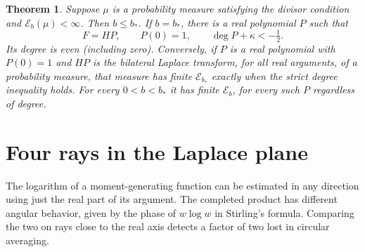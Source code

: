 \documentclass[11pt]{article}
\newtheorem{theorem}{Theorem}
\newcommand{\E}{\mathcal E}\newcommand{\F}{\mathcal F}
\begin{document}
\begin{theorem}\label{main}
Suppose $\mu$ is a probability measure satisfying the divisor condition and $\E_b(\mu)<\infty$. Then $b\le b_*$. If $b=b_*$, there is a real polynomial $P$ such that
\begin{equation}\label{classification}
 F=HP,\qquad P(0)=1,\qquad \deg P+\kappa<-\tfrac12.
\end{equation}
Its degree is even (including zero). Conversely, if $P$ is a real polynomial with $P(0)=1$ and $HP$ is the bilateral Laplace transform, for all real arguments, of a probability measure, that measure has finite $\E_{b_*}$ exactly when the strict degree inequality holds. For every $0<b<b_*$ it has finite $\E_b$, for every such $P$ regardless of degree.
\end{theorem}

\section{Four rays in the Laplace plane}
The logarithm of a moment-generating function can be estimated in any direction using just the real part of its argument. The completed product has different angular behavior, given by the phase of $w\log w$ in Stirling's formula. Comparing the two on rays close to the real axis detects a factor of two lost in circular averaging.
\end{document}
